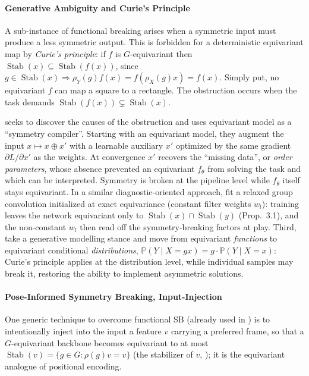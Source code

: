 \documentclass[mathematics,review,submit,moreauthors]{Definitions/mdpi}
\begin{document}
\paragraph{Generative Ambiguity and Curie's Principle}\label{sec:curie-principle}
A sub-instance of functional breaking arises when a symmetric input must produce a less symmetric output.
This is forbidden for a deterministic equivariant map by \emph{Curie's principle}: if $f$ is $G$-equivariant then $\operatorname{Stab}(x)\subseteq\operatorname{Stab}(f(x))$, since $g\in\operatorname{Stab}(x)\Rightarrow\rho_Y(g)f(x)=f(\rho_X(g)x)=f(x)$.
Simply put, no equivariant $f$ can map a square to a rectangle.
The obstruction occurs when the task demands $\operatorname{Stab}(f(x))\subsetneq\operatorname{Stab}(x)$.

\citet{smidt2021prr} seeks to discover the causes of the obstruction and uses equivariant model as a ``symmetry compiler''.
Starting with an equivariant model, they augment the input $x\mapsto x\oplus x'$ with a learnable auxiliary $x'$ optimized by the same gradient $\partial L/\partial x'$ as the weights. 
At convergence $x'$ recovers the ``missing data'', or \emph{order parameters}, whose absence prevented an equivariant $f_\theta$ from solving the task and which can be interpreted.
Symmetry is broken at the pipeline level while $f_\theta$ itself stays equivariant.
In a similar diagnostic-oriented approach, \citet{wang2024p4icml} fit a relaxed group convolution initialized at exact equivariance (constant filter weights $w_l$): training leaves the network equivariant only to $\operatorname{Stab}(x)\cap\operatorname{Stab}(y)$ (Prop.~3.1), and the non-constant $w_l$ then read off the symmetry-breaking factors at play.
Third, \citet{lawrence2024} take a generative modelling stance and move from equivariant \emph{functions} to equivariant conditional \emph{distributions}, $\mathbb{P}(Y\mid X{=}gx)=g\cdot\mathbb{P}(Y\mid X{=}x)$: Curie's principle applies at the distribution level, while individual samples may break it, restoring the ability to implement asymmetric solutions.

\paragraph{Pose-Informed Symmetry Breaking, Input-Injection}
One generic technique to overcome functional SB (already used in ) is to intentionally inject into the input a feature $v$ carrying a preferred frame, so that a $G$-equivariant backbone becomes equivariant to at most $\operatorname{Stab}(v)=\{g\in G:\rho(g)v=v\}$ (the stabilizer of $v$, ); it is the equivariant analogue of positional encoding.
\end{document}
